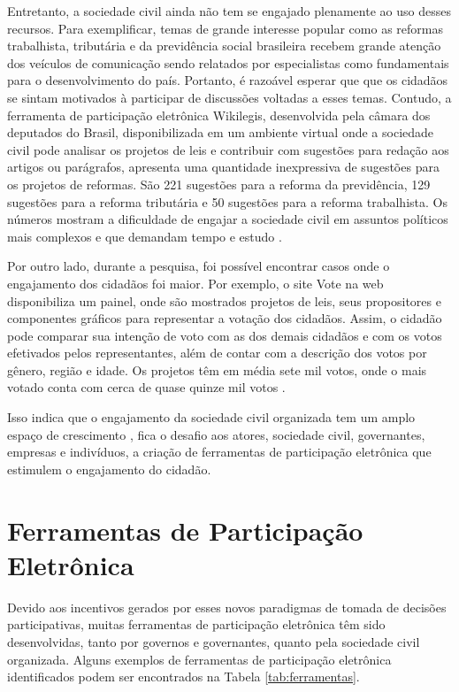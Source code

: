 \par
Entretanto, a sociedade civil ainda não tem se engajado plenamente ao uso desses recursos. Para exemplificar, temas de grande interesse popular 
como as reformas trabalhista, tributária e da previdência social brasileira recebem grande atenção dos veículos de comunicação sendo relatados por especialistas como fundamentais 
para o desenvolvimento do país. Portanto, é razoável esperar que que os cidadãos se sintam motivados à participar de discussões voltadas a esses temas. 
Contudo, a ferramenta de participação eletrônica Wikilegis, desenvolvida pela câmara dos deputados do Brasil, disponibilizada em um ambiente virtual onde a sociedade civil pode analisar
 os projetos de leis e contribuir com sugestões para redação aos artigos ou parágrafos, apresenta uma quantidade inexpressiva de sugestões para os projetos de reformas. 
 São 221 sugestões para a reforma da previdência, 129 sugestões para a reforma tributária e  50 sugestões para a reforma trabalhista.  Os números mostram a dificuldade de engajar 
 a sociedade civil em assuntos políticos mais complexos e que demandam tempo e estudo \cite{wikilegis}. 

\par
Por outro lado, durante a pesquisa, foi possível encontrar casos onde o engajamento dos cidadãos foi maior. Por exemplo, o site Vote na web disponibiliza um painel, onde são mostrados projetos de leis, 
seus propositores e componentes gráficos para representar a votação dos cidadãos.
Assim, o cidadão pode comparar sua intenção de voto com as dos demais cidadãos e com os votos efetivados pelos representantes, além de contar com a descrição dos votos por gênero,
região e idade. Os projetos têm em média sete mil votos, onde o mais votado conta com cerca de quase quinze mil votos \cite{votenaweb}.

\par
Isso indica que o engajamento da sociedade civil organizada tem um amplo espaço de crescimento \cite{o2011government}, fica o desafio aos atores, sociedade civil, governantes, 
empresas e indivíduos, a criação de ferramentas de participação eletrônica que estimulem o engajamento do cidadão.

\section{Ferramentas de Participação Eletrônica}
\label{sec:e-part tools}
Devido aos incentivos gerados por esses novos paradigmas de tomada de decisões participativas, muitas ferramentas de participação eletrônica têm sido desenvolvidas,
tanto por governos e governantes, quanto pela sociedade civil organizada. Alguns exemplos de ferramentas de participação eletrônica identificados podem ser encontrados na Tabela \ref{tab:ferramentas}.

